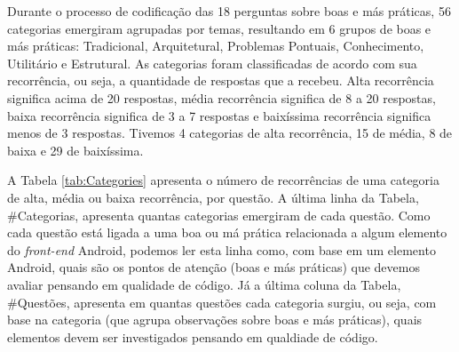 Durante o processo de codifica\c{c}\~ao das 18 perguntas sobre boas e m\'as pr\'aticas, 56 categorias emergiram agrupadas por temas, resultando em 6 grupos de boas e m\'as pr\'aticas: Tradicional, Arquitetural, Problemas Pontuais, Conhecimento, Utilit\'ario e Estrutural. As categorias foram classificadas de acordo com sua recorr\^encia, ou seja, a quantidade de respostas que a recebeu. Alta recorr\^encia significa acima de 20 respostas, m\'edia recorr\^encia significa de 8 a 20 respostas, baixa recorr\^encia significa de 3 a 7 respostas e baix\'issima recorr\^encia significa menos de 3 respostas. Tivemos 4 categorias de alta recorr\^encia, 15 de m\'edia, 8 de baixa e 29 de baix\'issima.

A Tabela \ref{tab:Categories} apresenta o n\'umero de recorr\^encias de uma categoria de alta, m\'edia ou baixa recorr\^encia, por quest\~ao. A \'ultima linha da Tabela, \#Categorias, apresenta quantas categorias emergiram de cada quest\~ao. Como cada quest\~ao est\'a ligada a uma boa ou m\'a pr\'atica relacionada a algum elemento do \textit{front-end} Android, podemos ler esta linha como, com base em um elemento Android, quais s\~ao os pontos de aten\c{c}\~ao (boas e m\'as pr\'aticas) que devemos avaliar pensando em qualidade de c\'odigo. J\'a a \'ultima coluna da Tabela, \#Quest\~oes, apresenta em quantas quest\~oes cada categoria surgiu, ou seja, com base na categoria (que agrupa observa\c{c}\~oes sobre boas e m\'as pr\'aticas), quais elementos devem ser investigados pensando em qualdiade de c\'odigo. 




